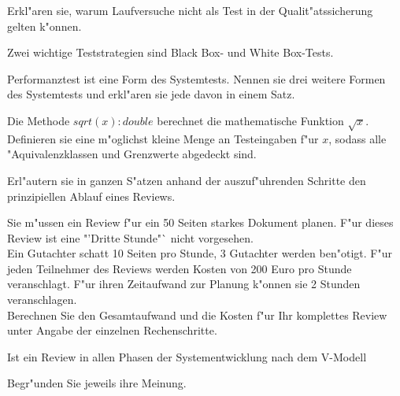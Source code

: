 \documentclass[12pt]{exam}
\begin{document}
\begin{questions}
\question[2] Erkl"aren sie, warum Laufversuche nicht als Test in der Qualit"atssicherung gelten k"onnen.
\addpoints

\question[2] Zwei wichtige Teststrategien sind Black Box- und White Box-Tests.
\noaddpoints
{}

\question[3] Performanztest ist eine Form des Systemtests. Nennen sie drei weitere Formen des Systemtests und erkl"aren sie jede davon in einem Satz.
\addpoints

\question[3] Die Methode $sqrt(x): double$ berechnet die mathematische Funktion $\sqrt{x}$. Definieren sie eine m"oglichst kleine Menge an Testeingaben f"ur $x$, sodass alle "Aquivalenzklassen und Grenzwerte abgedeckt sind.
\addpoints

\question[6] Erl"autern sie in ganzen S"atzen anhand der auszuf"uhrenden Schritte den prinzipiellen Ablauf eines Reviews.
\addpoints

\question[6] Sie m"ussen ein Review f"ur ein 50 Seiten starkes Dokument planen. F"ur dieses Review ist eine "'Dritte Stunde"` nicht vorgesehen. \\Ein Gutachter schatt 10 Seiten pro Stunde, 3 Gutachter werden ben"otigt. F"ur jeden Teilnehmer des Reviews werden Kosten von 200 Euro pro Stunde veranschlagt. F"ur ihren Zeitaufwand zur Planung k"onnen sie 2 Stunden veranschlagen. \\Berechnen Sie den Gesamtaufwand und die Kosten f"ur Ihr komplettes Review unter Angabe der einzelnen Rechenschritte.
\addpoints

\question[4] Ist ein Review in allen Phasen der Systementwicklung nach dem V-Modell
Begr"unden Sie jeweils ihre Meinung.


\end{questions}
\end{document}
